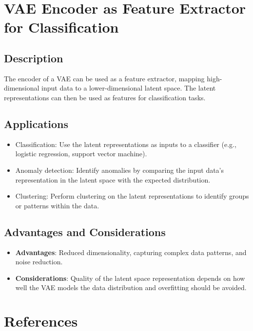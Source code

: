 \documentclass{article}
\begin{document}
\section{VAE Encoder as Feature Extractor for Classification}

\subsection{Description}
The encoder of a VAE can be used as a feature extractor, mapping high-dimensional input data to a lower-dimensional latent space. The latent representations can then be used as features for classification tasks.

\subsection{Applications}
\begin{itemize}
    \item Classification: Use the latent representations as inputs to a classifier (e.g., logistic regression, support vector machine).
    \item Anomaly detection: Identify anomalies by comparing the input data's representation in the latent space with the expected distribution.
    \item Clustering: Perform clustering on the latent representations to identify groups or patterns within the data.
\end{itemize}

\subsection{Advantages and Considerations}
\begin{itemize}
    \item \textbf{Advantages}: Reduced dimensionality, capturing complex data patterns, and noise reduction.
    \item \textbf{Considerations}: Quality of the latent space representation depends on how well the VAE models the data distribution and overfitting should be avoided.
\end{itemize}




\section*{References}
\end{document}
